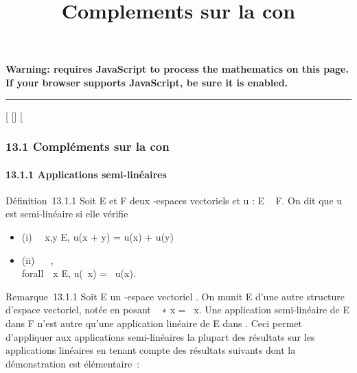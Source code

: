 \documentclass[]{article}
\title{Complements sur la con\jmathugaison}
\author{}
\date{}
\begin{document}
\maketitle

\textbf{Warning: 
requires JavaScript to process the mathematics on this page.\\ If your
browser supports JavaScript, be sure it is enabled.}

\begin{center}\rule{3in}{0.4pt}\end{center}

{[}
{[}{]}
{[}

\subsubsection{13.1 Compléments sur la con\jmathugaison}

\paragraph{13.1.1 Applications semi-linéaires}

Définition~13.1.1 Soit E et F deux -espaces vectoriels et u : E \rightarrow~ F. On
dit que u est semi-linéaire si elle vérifie

\begin{itemize}
\itemsep1pt\parskip0pt
\item
  (i) \forall~~x,y \in E, u(x + y) = u(x) + u(y)
\item
  (ii) \forall~\lambda~ \in {}, \\forall~~x \in
  E, u(\lambda~x) = \overline\lambda~u(x).
\end{itemize}

Remarque~13.1.1 Soit E un -espace vectoriel . On munit E d'une autre
structure d'espace vectoriel, notée \checkE en posant
\lambda~ ∗ x = \overline\lambda~x. Une application semi-linéaire de
E dans F n'est autre qu'une application linéaire de E dans
\checkF. Ceci permet d'appliquer aux applications
semi-linéaires la plupart des résultats sur les applications linéaires
en tenant compte des résultats suivants dont la démonstration est
élémentaire~:
\end{document}
